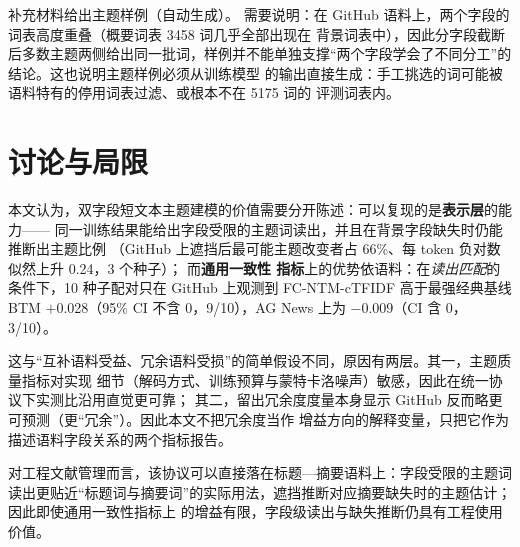 \documentclass{article}
\begin{document}
补充材料给出主题样例（自动生成）。
需要说明：在 GitHub 语料上，两个字段的词表高度重叠（概要词表 3458 词几乎全部出现在
背景词表中），因此分字段截断后多数主题两侧给出同一批词，样例并不能单独支撑“两个字段学会了不同分工”的结论。这也说明主题样例必须从训练模型
的输出直接生成：手工挑选的词可能被语料特有的停用词表过滤、或根本不在 5175 词的
评测词表内。

\section{讨论与局限}

本文认为，双字段短文本主题建模的价值需要分开陈述：可以复现的是\textbf{表示层}的能力——
同一训练结果能给出字段受限的主题词读出，并且在背景字段缺失时仍能推断出主题比例
（GitHub 上遮挡后最可能主题改变者占 66\%、每 token 负对数似然上升 0.24，3 个种子）；
而\textbf{通用一致性
指标}上的优势依语料：在\emph{读出匹配}的条件下，10 种子配对只在 GitHub 上观测到
FC-NTM-cTFIDF 高于最强经典基线 BTM $+$0.028（95\% CI 不含 0，9/10），AG News 上为
$-$0.009（CI 含 0，3/10）。

这与“互补语料受益、冗余语料受损”的简单假设不同，原因有两层。其一，主题质量指标对实现
细节（解码方式、训练预算与蒙特卡洛噪声）敏感，因此在统一协议下实测比沿用直觉更可靠；
其二，留出冗余度度量本身显示 GitHub 反而略更可预测（更“冗余”）。因此本文不把冗余度当作
增益方向的解释变量，只把它作为描述语料字段关系的两个指标报告。

对工程文献管理而言，该协议可以直接落在标题—摘要语料上：字段受限的主题词读出更贴近“标题词与摘要词”的实际用法，遮挡推断对应摘要缺失时的主题估计；因此即使通用一致性指标上
的增益有限，字段级读出与缺失推断仍具有工程使用价值。
\end{document}
